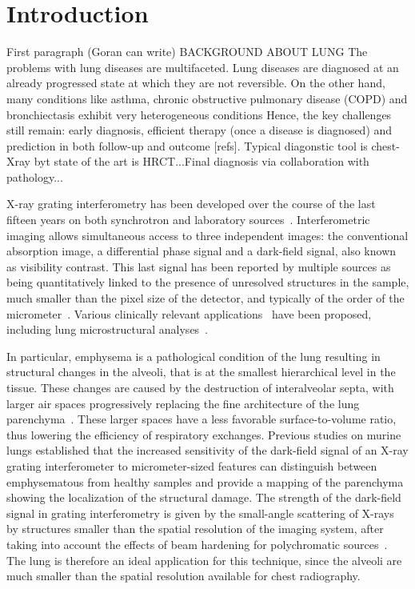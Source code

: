 \section{Introduction}\label{sec:introduction}
First paragraph (Goran can write) BACKGROUND ABOUT LUNG
The problems with lung diseases are multifaceted. Lung diseases are diagnosed at an already progressed state at which they are not reversible. On the other hand, many conditions like asthma, chronic obstructive pulmonary disease (COPD) and bronchiectasis exhibit very heterogeneous conditions Hence, the key challenges still remain: early diagnosis, efficient therapy (once a disease is diagnosed) and prediction in both follow-up and outcome [refs]. Typical diagonstic tool is chest-Xray byt state of the art is HRCT...Final diagnosis via collaboration with pathology...

X-ray grating interferometry has been developed over the course of the last
  fifteen years on both synchrotron and laboratory
sources~\cite{David_2002,1347-4065-42-7B-L866,Weitkamp_2005,1347-4065-45-6R-5254,Pfeiffer2006}. Interferometric
imaging allows simultaneous access to three independent images: the
conventional absorption image, a differential phase signal and a dark-field
signal, also known as visibility contrast. This last signal has been
reported by multiple sources as being quantitatively linked to the presence
of unresolved structures in the sample, much smaller than the pixel size of
the detector, and typically of the order of the
micrometer~\cite{Pfeiffer2008,Lynch:11,Yashiro:10}.
Various clinically relevant
applications~\cite{Wen_2009,Thilo2013} have been
proposed, including lung microstructural analyses~\cite{Schleede17880,Meinel_2014,Meinel_2013,Yaroshenko_2013,Modregger2016}.

In particular, emphysema is a pathological condition of the lung
resulting in structural changes in the alveoli, that is at the smallest
hierarchical level in the tissue. These changes are caused by the
destruction of interalveolar septa, with larger air spaces progressively
replacing the fine architecture of the lung parenchyma~\cite{Sharafkhaneh_2008}. These larger spaces
have a less favorable surface-to-volume ratio, thus lowering the efficiency
of respiratory exchanges. Previous studies on murine lungs established that the increased sensitivity of
the dark-field signal of an X-ray grating interferometer to micrometer-sized
features can distinguish between emphysematous from healthy samples and
provide a mapping of the parenchyma showing the localization of the
structural damage. The strength of the dark-field signal in grating interferometry is
given by the small-angle scattering of X-rays by structures smaller than the
spatial resolution of the imaging system, after taking into account the effects of beam hardening for polychromatic sources~\cite{Koenig2016}. The lung is therefore an ideal
application for this technique, since the alveoli are much
smaller than the spatial resolution available for chest radiography.

